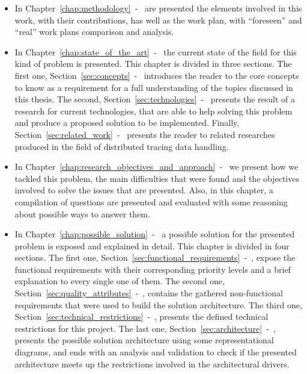 \begin{itemize}
    \item In Chapter~\ref{chap:methodology}~-~ are presented the elements involved in this work, with their contributions, has well as the work plan, with ``foreseen'' and ``real'' work plans comparison and analysis.
    \item In Chapter~\ref{chap:state_of_the_art}~-~ the current state of the field for this kind of problem is presented. This chapter is divided in three sections. The first one, Section~\ref{sec:concepts}~-~ introduces the reader to the core concepts to know as a requirement for a full understanding of the topics discussed in this thesis. The second, Section~\ref{sec:technologies}~-~ presents the result of a research for current technologies, that are able to help solving this problem and produce a proposed solution to be implemented. Finally, Section~\ref{sec:related_work}~-~ presents the reader to related researches produced in the field of distributed tracing data handling.
    \item In Chapter~\ref{chap:research_objectives_and_approach}~-~ we present how we tackled this problem, the main difficulties that were found and the objectives involved to solve the issues that are presented. Also, in this chapter, a compilation of questions are presented and evaluated with some reasoning about possible ways to answer them.
    \item In Chapter~\ref{chap:possible_solution}~-~ a possible solution for the presented problem is exposed and explained in detail. This chapter is divided in four sections. The first one, Section~\ref{sec:functional_requirements}~-~, expose the functional requirements with their corresponding priority levels and a brief explanation to every single one of them. The second one, Section~\ref{sec:quality_attributes}~-~, contains the gathered non-functional requirements that were used to build the solution architecture. The third one, Section~\ref{sec:technical_restrictions}~-~, presents the defined technical restrictions for this project. The last one, Section~\ref{sec:architecture}~-~, presents the possible solution architecture using some representational diagrams, and ends with an analysis and validation to check if the presented architecture meets up the restrictions involved in the architectural drivers.

\end{itemize}
